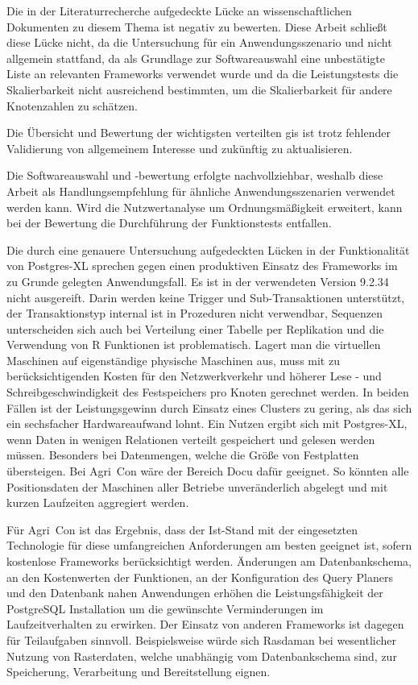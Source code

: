 Die in der Literaturrecherche aufgedeckte Lücke an wissenschaftlichen Dokumenten zu diesem Thema ist negativ zu bewerten.
Diese Arbeit schließt diese Lücke nicht, da die Untersuchung für ein Anwendungsszenario und nicht allgemein stattfand, da als Grundlage zur Softwareauswahl eine unbestätigte Liste an relevanten Frameworks verwendet wurde und da die Leistungstests die Skalierbarkeit nicht ausreichend bestimmten, um  die Skalierbarkeit für andere Knotenzahlen zu schätzen.

Die Übersicht und Bewertung der wichtigsten verteilten \Gls{gis} ist trotz fehlender Validierung von allgemeinem Interesse und zukünftig zu aktualisieren.

Die Softwareauswahl und -bewertung erfolgte nachvollziehbar, weshalb diese Arbeit als Handlungsempfehlung für ähnliche Anwendungsszenarien verwendet werden kann.
Wird die Nutzwertanalyse um Ordnungsmäßigkeit erweitert, kann bei der Bewertung die Durchführung der Funktionstests entfallen.

Die durch eine genauere Untersuchung aufgedeckten Lücken in der Funktionalität von Postgres-XL sprechen gegen einen produktiven Einsatz des Frameworks im zu Grunde gelegten Anwendungsfall.
Es ist in der verwendeten Version 9.2.34 nicht ausgereift.
Darin werden keine Trigger und Sub-Transaktionen unterstützt, der Transaktionstyp internal ist in Prozeduren nicht verwendbar, Sequenzen unterscheiden sich auch bei Verteilung einer Tabelle per Replikation und die Verwendung von R Funktionen ist problematisch.
Lagert man die virtuellen Maschinen auf eigenständige physische Maschinen aus, muss mit zu berücksichtigenden Kosten für den Netzwerkverkehr und höherer Lese - und Schreibgeschwindigkeit des Festspeichers pro Knoten gerechnet werden.
In beiden Fällen ist der Leistungsgewinn durch Einsatz eines Clusters zu gering, als das sich ein sechsfacher Hardwareaufwand lohnt.
Ein Nutzen ergibt sich mit Postgres-XL, wenn Daten in wenigen Relationen verteilt gespeichert und gelesen werden müssen.
Besonders bei Datenmengen, welche die Größe von Festplatten übersteigen.
Bei Agri~Con wäre der Bereich Docu dafür geeignet.
So könnten alle Positionsdaten der Maschinen aller Betriebe unveränderlich abgelegt und mit kurzen Laufzeiten aggregiert werden.

Für Agri~Con ist das Ergebnis, dass der Ist-Stand mit der eingesetzten Technologie für diese umfangreichen Anforderungen am besten geeignet ist, sofern kostenlose Frameworks berücksichtigt werden.
Änderungen am Datenbankschema, an den Kostenwerten der Funktionen, an der Konfiguration des Query Planers und den Datenbank nahen Anwendungen erhöhen die Leistungsfähigkeit der PostgreSQL Installation um die gewünschte Verminderungen im Laufzeitverhalten zu erwirken.
Der Einsatz von anderen Frameworks ist dagegen für Teilaufgaben sinnvoll.
Beispielsweise würde sich Rasdaman bei wesentlicher Nutzung von Rasterdaten, welche unabhängig vom Datenbankschema sind, zur Speicherung, Verarbeitung und Bereitstellung eignen.


